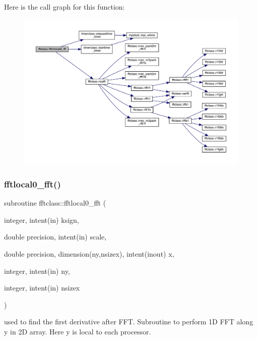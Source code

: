 Here is the call graph for this function\+:\nopagebreak
\begin{figure}[H]
\begin{center}
\leavevmode
\includegraphics[width=350pt]{namespacefftclass_a62d05d7b0980c823708d03f4a1520c1e_cgraph}
\end{center}
\end{figure}
\mbox{\label{namespacefftclass_a501325267c1425bfece04a18e20efe31}} 
\subsubsection{\texorpdfstring{fftlocal0\_fft()}{fftlocal0\_fft()}}
{\footnotesize\ttfamily subroutine fftclass\+::fftlocal0\+\_\+fft (\begin{DoxyParamCaption}\item[{integer, intent(in)}]{ksign,  }\item[{double precision, intent(in)}]{scale,  }\item[{double precision, dimension(ny,nsizex), intent(inout)}]{x,  }\item[{integer, intent(in)}]{ny,  }\item[{integer, intent(in)}]{nsizex }\end{DoxyParamCaption})}



used to find the first derivative after F\+FT. Subroutine to perform 1D F\+FT along y in 2D array. Here y is local to each processor. 

